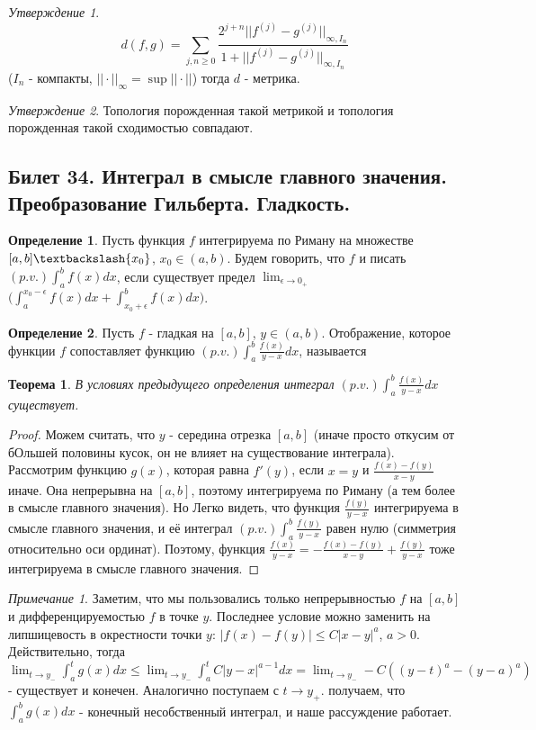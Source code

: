 \documentclass[a4paper]{article}
\theoremstyle{indented}
\newtheorem{theorem}{Теорема}
\theoremstyle{definition}
\newtheorem{defn}{Определение}
\theoremstyle{remark}
\newtheorem{remark}{Примечание}
\newtheorem{stat}{Утверждение}
\DeclareMathOperator{\ra}{\rightarrow}
\begin{document}
\begin{stat}
    $$
    d(f,g) = \sum\limits_{j,n\geq 0} \frac{ 2^{j+n} ||f^{(j)}-g^{(j)}||_{\infty, I_n}}{1+||f^{(j)}-g^{(j)}||_{\infty, I_n}}
    $$
    ($I_n$ - компакты, $||\cdot||_\infty = \sup||\cdot||$) тогда $d$ - метрика.
\end{stat}

\begin{stat}
    Топология порожденная такой метрикой и топология порожденная такой сходимостью совпадают.
\end{stat}

\subsection{Билет 34. Интеграл в смысле главного значения. Преобразование Гильберта. Гладкость.}
\begin{defn}
Пусть функция $f$ интегрируема по Риману на множестве $[a, b] \textbackslash \{x_0\}$, $x_0 \in (a, b)$. Будем говорить, что $f$  и писать $(p.v.) \int_a^b f(x) dx$, если существует предел $\lim_{\epsilon \ra 0_+}$ $\Big ( \int_a^{x_0-\epsilon} f(x)dx +\int_{x_0+\epsilon}^b f(x)dx \Big )$.
\end{defn}
\begin{defn}
Пусть $f$ - гладкая на $[a, b]$, $y \in (a, b)$. Отображение, которое функции $f$ сопоставляет функцию $(p.v.) \int_a^b \frac{f(x)}{y-x} dx$, называется 
\end{defn}
\begin{theorem}
В условиях предыдущего определения интеграл $(p.v.) \int_a^b \frac{f(x)}{y-x} dx$ существует.
\end{theorem}
\begin{proof}
Можем считать, что $y$ - середина отрезка $[a, b]$ (иначе просто откусим от бОльшей половины кусок, он не влияет на существование интеграла). Рассмотрим функцию $g(x)$, которая равна $f'(y)$, если $x=y$ и $\frac{f(x)-f(y)}{x-y}$ иначе. Она непрерывна на $[a, b]$, поэтому интегрируема по Риману (а тем более в смысле главного значения). Но Легко видеть, что функция $\frac{f(y)}{y-x}$ интегрируема в смысле главного значения, и её интеграл $(p.v.) \int_a^b \frac{f(y)}{y-x}$ равен нулю (симметрия относительно оси ординат). Поэтому, функция $\frac{f(x)}{y-x}=-\frac{f(x)-f(y)}{x-y}+\frac{f(y)}{y-x}$ тоже интегрируема в смысле главного значения.
\end{proof}
\begin{remark}
Заметим, что мы пользовались только непрерывностью $f$ на $[a, b]$ и дифференцируемостью $f$ в точке $y$. Последнее условие можно заменить на липшицевость в окрестности точки $y$: $|f(x)-f(y)| \leq C|x-y|^{a}$, $a>0$. Действительно, тогда $\lim_{t \ra y_-} \int_a^t g(x) dx \leq \lim_{t \ra y_-} \int_a^t C|y-x|^{a-1} dx=\lim_{t \ra y_-} -C((y-t)^a-(y-a)^a)$ - существует и конечен. Аналогично поступаем с $t \ra y_+$. получаем, что $\int_a^b g(x) dx$ - конечный несобственный интеграл, и наше рассуждение работает.
\end{remark}
\end{document}
